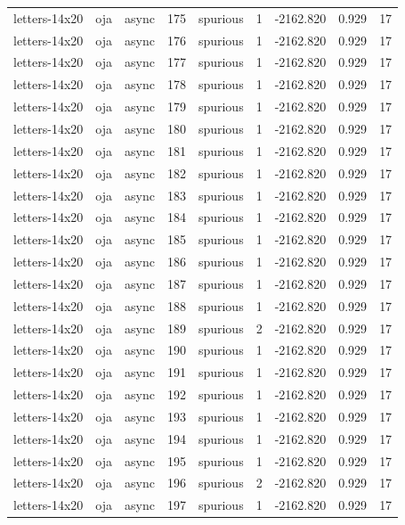 \begin{tabular}{lllrlrrrr}
letters-14x20 & oja & async & 175 & spurious & 1 & -2162.820 & 0.929 & 17 \\
letters-14x20 & oja & async & 176 & spurious & 1 & -2162.820 & 0.929 & 17 \\
letters-14x20 & oja & async & 177 & spurious & 1 & -2162.820 & 0.929 & 17 \\
letters-14x20 & oja & async & 178 & spurious & 1 & -2162.820 & 0.929 & 17 \\
letters-14x20 & oja & async & 179 & spurious & 1 & -2162.820 & 0.929 & 17 \\
letters-14x20 & oja & async & 180 & spurious & 1 & -2162.820 & 0.929 & 17 \\
letters-14x20 & oja & async & 181 & spurious & 1 & -2162.820 & 0.929 & 17 \\
letters-14x20 & oja & async & 182 & spurious & 1 & -2162.820 & 0.929 & 17 \\
letters-14x20 & oja & async & 183 & spurious & 1 & -2162.820 & 0.929 & 17 \\
letters-14x20 & oja & async & 184 & spurious & 1 & -2162.820 & 0.929 & 17 \\
letters-14x20 & oja & async & 185 & spurious & 1 & -2162.820 & 0.929 & 17 \\
letters-14x20 & oja & async & 186 & spurious & 1 & -2162.820 & 0.929 & 17 \\
letters-14x20 & oja & async & 187 & spurious & 1 & -2162.820 & 0.929 & 17 \\
letters-14x20 & oja & async & 188 & spurious & 1 & -2162.820 & 0.929 & 17 \\
letters-14x20 & oja & async & 189 & spurious & 2 & -2162.820 & 0.929 & 17 \\
letters-14x20 & oja & async & 190 & spurious & 1 & -2162.820 & 0.929 & 17 \\
letters-14x20 & oja & async & 191 & spurious & 1 & -2162.820 & 0.929 & 17 \\
letters-14x20 & oja & async & 192 & spurious & 1 & -2162.820 & 0.929 & 17 \\
letters-14x20 & oja & async & 193 & spurious & 1 & -2162.820 & 0.929 & 17 \\
letters-14x20 & oja & async & 194 & spurious & 1 & -2162.820 & 0.929 & 17 \\
letters-14x20 & oja & async & 195 & spurious & 1 & -2162.820 & 0.929 & 17 \\
letters-14x20 & oja & async & 196 & spurious & 2 & -2162.820 & 0.929 & 17 \\
letters-14x20 & oja & async & 197 & spurious & 1 & -2162.820 & 0.929 & 17 \\

\end{tabular}
